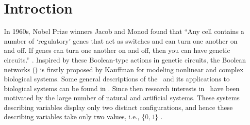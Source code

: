 \section{Introction}
\label{sec:intro}
In 1960s, Nobel Prize winners Jacob and Monod found that  ``Any cell contains a number of `regulatory' genes that act as switches and can turn one another on and off. If genes can turn one another on and off, then you can have genetic circuits.'' \cite{Waldrop1992Complexity,cheng2009controllability}. Inspired by these Boolean-type actions in genetic circuits, the Boolean networks (\BNs) is firstly proposed by Kauffman \cite{Kauffman1968Metabolic} for modeling nonlinear and complex biological systems. Some general descriptions of the \BNs\ and its applications to biological systems can be found in \cite{Kauffman1968Metabolic}. Since then research interests in  \BNs\ have been motivated by the large number of natural and artificial systems. These systems describing variables display only two distinct configurations, and hence these describing variables take only two values, i.e., $\{0,1\}$  \cite{Akutsu2000Inferring, Shmulevich2002From, Faur2006Dynamical,Green2007The,Lou2010Multi,Fornasini2013Observability}.


